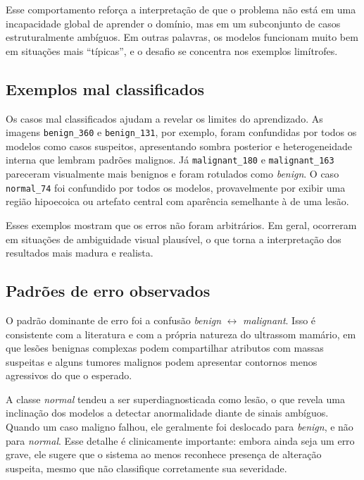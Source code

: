 \documentclass[tcc,capa]{texufpel}
\begin{document}
Esse comportamento reforça a interpretação de que o problema não está em uma incapacidade global de aprender o domínio, mas em um subconjunto de casos estruturalmente ambíguos. Em outras palavras, os modelos funcionam muito bem em situações mais “típicas”, e o desafio se concentra nos exemplos limítrofes.

\subsection{Exemplos mal classificados}

Os casos mal classificados ajudam a revelar os limites do aprendizado. As imagens \texttt{benign\_360} e \texttt{benign\_131}, por exemplo, foram confundidas por todos os modelos como casos suspeitos, apresentando sombra posterior e heterogeneidade interna que lembram padrões malignos. Já \texttt{malignant\_180} e \texttt{malignant\_163} pareceram visualmente mais benignos e foram rotulados como \textit{benign}. O caso \texttt{normal\_74} foi confundido por todos os modelos, provavelmente por exibir uma região hipoecoica ou artefato central com aparência semelhante à de uma lesão.

Esses exemplos mostram que os erros não foram arbitrários. Em geral, ocorreram em situações de ambiguidade visual plausível, o que torna a interpretação dos resultados mais madura e realista.

\subsection{Padrões de erro observados}

O padrão dominante de erro foi a confusão \textit{benign} \(\leftrightarrow\) \textit{malignant}. Isso é consistente com a literatura e com a própria natureza do ultrassom mamário, em que lesões benignas complexas podem compartilhar atributos com massas suspeitas e alguns tumores malignos podem apresentar contornos menos agressivos do que o esperado.

A classe \textit{normal} tendeu a ser superdiagnosticada como lesão, o que revela uma inclinação dos modelos a detectar anormalidade diante de sinais ambíguos. Quando um caso maligno falhou, ele geralmente foi deslocado para \textit{benign}, e não para \textit{normal}. Esse detalhe é clinicamente importante: embora ainda seja um erro grave, ele sugere que o sistema ao menos reconhece presença de alteração suspeita, mesmo que não classifique corretamente sua severidade.
\end{document}

